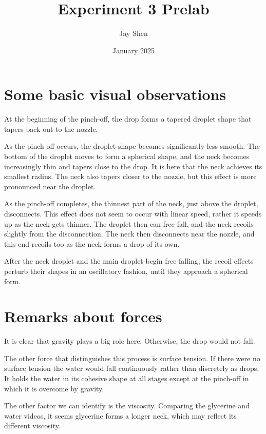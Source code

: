 \documentclass[12pt, letterpaper]{article}
\title{Experiment 3 Prelab}
\author{Jay Shen}
\date{January 2025}
\begin{document}
\maketitle

\section{Some basic visual observations}

At the beginning of the pinch-off, the drop forms a tapered droplet shape that tapers back out to the nozzle. 

As the pinch-off occurs, the droplet shape becomes significantly less smooth. The bottom of the droplet moves to form a spherical shape, and the neck becomes increasingly thin and tapers close to the drop. It is here that the neck achieves its smallest radius. The neck also tapers closer to the nozzle, but this effect is more pronounced near the droplet. 

As the pinch-off completes, the thinnest part of the neck, just above the droplet, disconnects. This effect does not seem to occur with linear speed, rather it speeds up as the neck gets thinner. The droplet then can free fall, and the neck recoils slightly from the disconnection. The neck then disconnects near the nozzle, and this end recoils too as the neck forms a drop of its own. 

After the neck droplet and the main droplet begin free falling, the recoil effects perturb their shapes in an oscillatory fashion, until they approach a spherical form.  

\section{Remarks about forces}

It is clear that gravity plays a big role here. Otherwise, the drop would not fall. 

The other force that distinguishes this process is surface tension. If there were no surface tension the water would fall continuously rather than discretely as drops. It holds the water in its cohesive shape at all stages except at the pinch-off in which it is overcome by gravity. 

The other factor we can identify is the viscosity. Comparing the glycerine and water videos, it seems glycerine forms a longer neck, which may reflect its different viscosity. 
\end{document}
